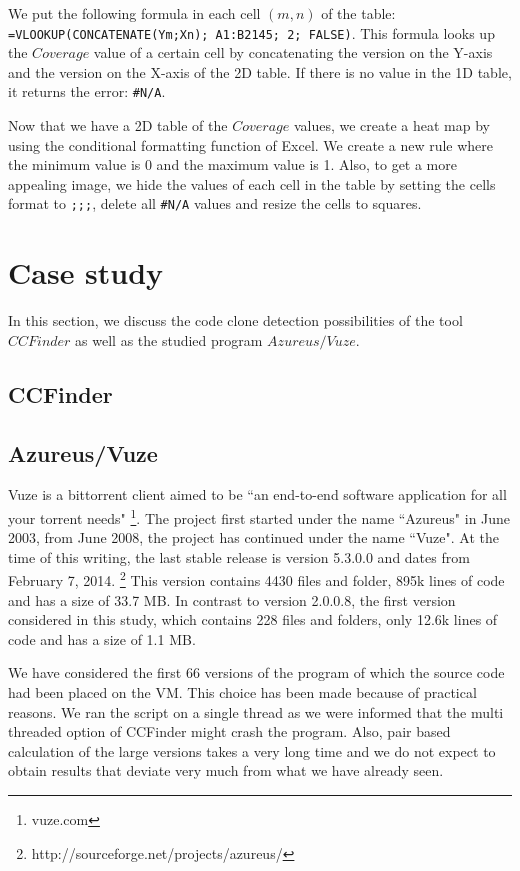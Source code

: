 \documentclass[a4paper,twoside, twocolumn, 11pt]{article}
\numberwithin{equation}{section}
\begin{document}
We put the following formula in each cell $(m,n)$ of the table: 
\texttt{=VLOOKUP(CONCATENATE(Ym;Xn); A1:B2145; 2; FALSE)}.
This formula looks up the $Coverage$ value of a certain cell by concatenating the version on the Y-axis and the version on the X-axis of the 2D table.
If there is no value in the 1D table, it returns the error: \texttt{\#N/A}.

Now that we have a 2D table of the $Coverage$ values, we create a heat map by using the conditional formatting function of Excel.
We create a new rule where the minimum value is 0 and the maximum value is 1.
Also, to get a more appealing image, we hide the values of each cell in the table by setting the cells format to \texttt{;;;}, delete all \texttt{\#N/A} values and resize the cells to squares.


\section{Case study}
In this section, we discuss the code clone detection possibilities of the tool $CCFinder$ as well as the studied program $Azureus/Vuze$.

\subsection{CCFinder}


\subsection{Azureus/Vuze}
Vuze is a bittorrent client aimed to be ``an end-to-end software application for all your torrent needs" \footnote{vuze.com}.
The project first started under the name ``Azureus" in June 2003, from June 2008, the project has continued under the name ``Vuze".
At the time of this writing, the last stable release is version 5.3.0.0 and dates from February 7, 2014. \footnote{http://sourceforge.net/projects/azureus/}
This version contains 4430 files and folder, 895k lines of code and has a size of 33.7 MB. 
In contrast to version 2.0.0.8, the first version considered in this study, which contains 228 files and folders, only 12.6k lines of code and has a size of 1.1 MB.

We have considered the first 66 versions of the program of which the source code had been placed on the VM. 
This choice has been made because of practical reasons. 
We ran the script on a single thread as we were informed that the multi threaded option of CCFinder might crash the program. 
Also, pair based calculation of the large versions takes a very long time and we do not expect to obtain results that deviate very much from what we have already seen.
\end{document}
